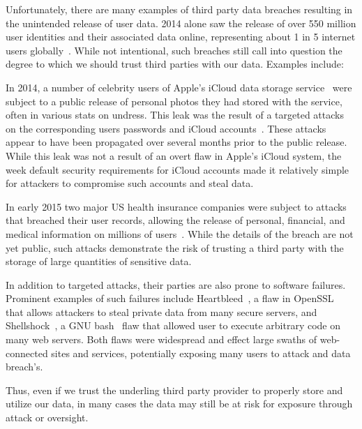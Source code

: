 Unfortunately, there are many examples of third party data breaches
resulting in the unintended release of user data. 2014 alone saw the
release of over 550 million user identities and their associated data
online, representing about 1 in 5 internet users
globally~\cite{symanteccorporation2014}. While not intentional, such
breaches still call into question the degree to which we should trust
third parties with our data. Examples include:

\begin{packed_desc}
\item[Apple iCloud Celebrity Photo Leak:] In 2014, a number of
  celebrity users of Apple's iCloud data storage
  service~\cite{apple-icloud} were subject to a public release of
  personal photos they had stored with the service, often in various
  stats on undress. This leak was the result of a targeted attacks on
  the corresponding users passwords and iCloud
  accounts~\cite{apple-icloudleak}. These attacks appear to have been
  propagated over several months prior to the public release. While
  this leak was not a result of an overt flaw in Apple's iCloud
  system, the week default security requirements for iCloud accounts
  made it relatively simple for attackers to compromise such accounts
  and steal data.
\item[Anthem and Premera Blue Cross Breaches:] In early 2015 two major
  US health insurance companies were subject to attacks that breached
  their user records, allowing the release of personal, financial, and
  medical information on millions of users~\cite{krebs-anthem,
    krebs-premera}. While the details of the breach are not yet
  public, such attacks demonstrate the risk of trusting a third party
  with the storage of large quantities of sensitive data.
\item[Heartbleed, Shellshock, Etc:] In addition to targeted attacks,
  their parties are also prone to software failures. Prominent
  examples of such failures include Heartbleed~\cite{heartbleed}, a
  flaw in OpenSSL~\cite{openssl} that allows attackers to steal
  private data from many secure servers, and
  Shellshock~\cite{symantec-shellshock}, a GNU bash~\cite{gnu-bash}
  flaw that allowed user to execute arbitrary code on many web
  servers. Both flaws were widespread and effect large swaths of
  web-connected sites and services, potentially exposing many users to
  attack and data breach's.
\end{packed_desc}

Thus, even if we trust the underling third party provider to properly
store and utilize our data, in many cases the data may still be at
risk for exposure through attack or oversight.

